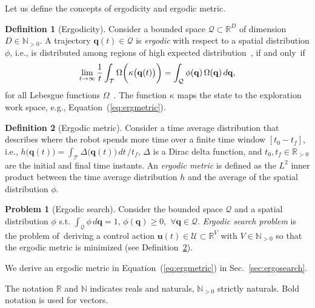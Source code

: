\documentclass[letterpaper,10pt,conference,twoside]{IEEEtran}
\theoremstyle{definition}
\newtheorem{defn}{Definition}[section]
\newtheorem{pb}{Problem}[section]
\begin{document}
Let us define the concepts of ergodicity and ergodic metric.

\begin{defn}[Ergodicity]
  Consider a bounded space $\mathcal{Q}\subset\mathbb{R}^D$ of dimension $D\in\mathbb{N}_{>0}$. 
  A trajectory $\mathbf{q}(t)\in\mathcal{Q}$ is \textit{ergodic} with respect to a spatial distribution $\phi$, i.e., is distributed among regions of high expected distribution~\cite{miller2016ergodic}, if and only~if
  \begin{equation}
    \lim_{t\rightarrow \infty}{\small
      \frac{1}{t}\int_{\mathcal{T}}\Omega\bigg(\kappa\big(\mathbf{q}(t)\big)\bigg)=\int_{\mathcal{Q}}\phi(\mathbf{q})\,\Omega(\mathbf{q})\,d\mathbf{q},
    }
  \end{equation}
  for all Lebesgue functions $\Omega$~\cite{mathew2011metrics}. The function $\kappa$ maps the state to the exploration work space, e.g., Equation~(\ref{eq:ergmetric}).
  \end{defn}

\begin{defn}[Ergodic metric]\label{def:ergom}
  Consider a time average distribution that describes where the robot spends more time over a finite time window $[t_0-t_f]$, i.e., $h\big(\mathbf{q}(t)\big)=\int_{\mathcal{T}}{\Delta\big(\mathbf{q}(t)\big)}\,dt\,/t_f$, $\Delta$ is a Dirac delta function, and $t_0,t_f\in\mathbb{R}_{>0}$ are the initial and final time instants. 
  An \textit{ergodic metric} is defined as the $L^2$ inner product between the time average distribution $h$ and the average of the spatial distribution $\phi$.
\end{defn}

\begin{pb}[Ergodic search]\label{pb:ergo}
  Consider the bounded space $\mathcal{Q}$ and a spatial distribution $\phi$ s.t. $\int_{\mathcal{Q}}\phi\,d\mathbf{q}=1,\,\phi(\mathbf{q})\geq 0,\,\, \forall \mathbf{q}\in\mathcal{Q}$.
  \textit{Ergodic search problem} is the problem of~deriving a control action $\mathbf{u}(t)\in\mathcal{U}\subset\mathbb{R}^V$ with $V\in\mathbb{N}_{>0}$ so that the ergodic metric is minimized (see Definition~\ref{def:ergom}). %
\end{pb}

We derive an ergodic metric in Equation~(\ref{eq:ergmetric}) in Sec.~\ref{sec:ergosearch}.

The notation $\mathbb{R}$ and $\mathbb{N}$ indicates reals and naturals, $\mathbb{N}_{>0}$ strictly naturals. Bold notation is used for vectors.
%
\end{document}
